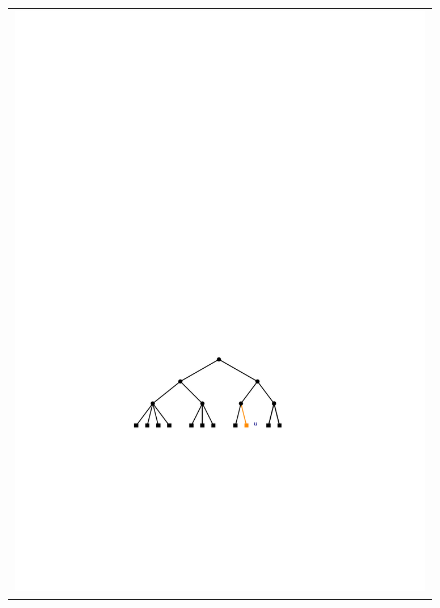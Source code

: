\begin{figure}
	\begin{center}
		\begin{tabular}{c}
			\includegraphics[height=\FifthHeightScaleIfNeeded]{figs/24tree-remove-1} \\

\end{tabular}
\end{center}
\end{figure}
